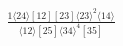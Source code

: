 \documentclass[varwidth, border=5pt]{standalone}
\begin{document}
\begin{my}
$\begin{gathered}
\scriptscriptstyle\frac{1⟨24⟩[12][23]⟨23⟩^2⟨14⟩}{⟨12⟩[25]⟨34⟩^4[35]}
\end{gathered}$
\end{my}
\end{document}
